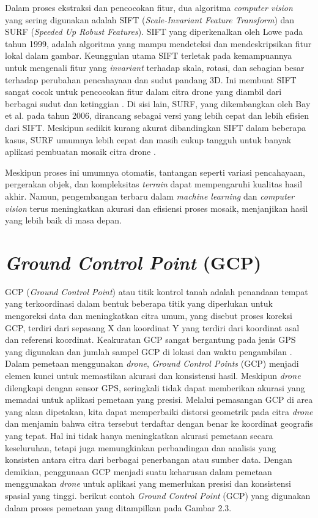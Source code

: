 Dalam proses ekstraksi dan pencocokan fitur, dua algoritma \textit{computer vision} yang sering digunakan adalah SIFT (\textit{Scale-Invariant Feature Transform}) dan SURF (\textit{Speeded Up Robust Features}). SIFT yang diperkenalkan oleh Lowe pada tahun 1999, adalah algoritma yang mampu mendeteksi dan mendeskripsikan fitur lokal dalam gambar. Keunggulan utama SIFT terletak pada kemampuannya untuk mengenali fitur yang \textit{invariant} terhadap skala, rotasi, dan sebagian besar terhadap perubahan pencahayaan dan sudut pandang 3D. Ini membuat SIFT sangat cocok untuk pencocokan fitur dalam citra drone yang diambil dari berbagai sudut dan ketinggian \citep{lowe2004distinctive}. Di sisi lain, SURF, yang dikembangkan oleh Bay et al. pada tahun 2006, dirancang sebagai versi yang lebih cepat dan lebih efisien dari SIFT. Meskipun sedikit kurang akurat dibandingkan SIFT dalam beberapa kasus, SURF umumnya lebih cepat dan masih cukup tangguh untuk banyak aplikasi pembuatan mosaik citra drone \citep{bay2006surf}.

Meskipun proses ini umumnya otomatis, tantangan seperti variasi pencahayaan, pergerakan objek, dan kompleksitas \textit{terrain} dapat mempengaruhi kualitas hasil akhir. Namun, pengembangan terbaru dalam \textit{machine learning} dan \textit{computer vision} terus meningkatkan akurasi dan efisiensi proses mosaik, menjanjikan hasil yang lebih baik di masa depan.


\section{\textit{Ground Control Point} (GCP)}

 GCP (\textit{Ground Control Point}) atau titik kontrol tanah adalah penandaan tempat yang terkoordinasi dalam bentuk beberapa titik yang diperlukan untuk mengoreksi data dan meningkatkan citra umum, yang disebut proses koreksi GCP, terdiri dari sepasang X dan koordinat Y yang terdiri dari koordinat asal dan referensi koordinat. Keakuratan GCP sangat bergantung pada jenis GPS yang digunakan dan jumlah sampel GCP di lokasi dan waktu pengambilan \citep{widodo2023pemanfaatan}. Dalam pemetaan menggunakan \textit{drone}, \textit{Ground Control Points} (GCP) menjadi elemen kunci untuk memastikan akurasi dan konsistensi hasil. Meskipun \textit{drone} dilengkapi dengan sensor GPS, seringkali tidak dapat memberikan akurasi yang memadai untuk aplikasi pemetaan yang presisi. Melalui pemasangan GCP di area yang akan dipetakan, kita dapat memperbaiki distorsi geometrik pada citra \textit{drone} dan menjamin bahwa citra tersebut terdaftar dengan benar ke koordinat geografis yang tepat. Hal ini tidak hanya meningkatkan akurasi pemetaan secara keseluruhan, tetapi juga memungkinkan perbandingan dan analisis yang konsisten antara citra dari berbagai penerbangan atau sumber data. Dengan demikian, penggunaan GCP menjadi suatu keharusan dalam pemetaan menggunakan \textit{drone} untuk aplikasi yang memerlukan presisi dan konsistensi spasial yang tinggi. berikut contoh \textit{Ground Control Point} (GCP) yang digunakan dalam proses pemetaan yang ditampilkan pada Gambar 2.3.


